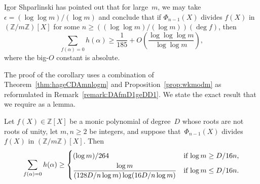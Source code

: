 \begin{remark}
Igor Shparlinski has pointed out that for large~$m$, we may take
${\epsilon}=(\log\log m)/(\log m)$ and conclude that if ${\Phi}_{n-1}(X)$ divides
$f(X)$ in $({\mathbb{Z}}/m{\mathbb{Z}})[X]$ for some
$n\ge((\log\log{m})/(\log{m}))(\deg{f})$, then
\[
  \sum_{f({\alpha})=0} h({\alpha}) \ge \frac{1}{185}+
    O\left(\frac{\log\log\log m}{\log\log m}\right),
\]
where the big-$O$ constant is absolute.
\end{remark}

The proof of the corollary uses a combination of
Theorem~\ref{thm:hageCDAmnlogm} and Proposition~\ref{prop:wkmodm} as
reformulated in Remark~\ref{remark:DAfmD1geDD1}.  We state the exact
result that we require as a lemma.

\begin{lemma}
\label{lemma:htgeelogm}
Let $f(X)\in{\mathbb{Z}}[X]$ be a monic polynomial of degree~$D$ whose roots
are not roots of unity, let $m,n\ge2$ be integers, and
suppose that~${\Phi}_{n-1}(X)$ divides $f(X)$ in $({\mathbb{Z}}/m{\mathbb{Z}})[X]$. Then
\[
  \sum_{f({\alpha})=0}h({\alpha}) \ge \begin{cases}
    (\log m)/264 &\text{if $\log m\ge D/16n$,} \\[1\jot]
    \dfrac{\log m}{(128D/n\log m)\log(16D/n\log m)}
          &\text{if $\log m\le D/16n$.} \\
  \end{cases}
\]
\end{lemma}
